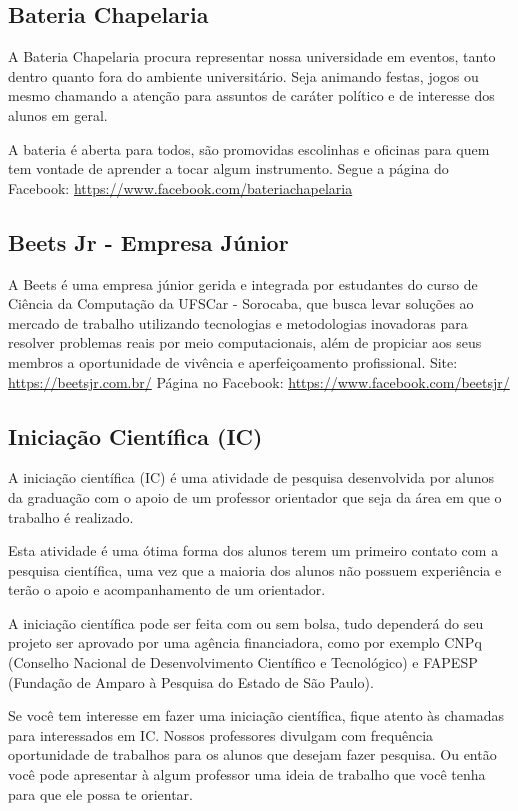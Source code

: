 \subsection{Bateria Chapelaria}
A Bateria Chapelaria procura representar nossa universidade em eventos, tanto dentro quanto fora do ambiente universitário. Seja animando festas, jogos ou mesmo chamando a atenção para assuntos de caráter político e de interesse dos alunos em geral.

A bateria é aberta para todos, são promovidas escolinhas e oficinas para quem tem vontade de aprender a tocar algum instrumento. Segue a página do Facebook: \newline \url{https://www.facebook.com/bateriachapelaria}

\subsection{Beets Jr - Empresa Júnior}
A Beets é uma empresa júnior gerida e integrada por estudantes do curso de Ciência da Computação da UFSCar - Sorocaba, que busca levar soluções ao mercado de trabalho utilizando tecnologias e metodologias inovadoras para resolver problemas reais por meio computacionais, além de propiciar aos seus membros a oportunidade de vivência e aperfeiçoamento profissional. \newline Site: \url{https://beetsjr.com.br/} \newline Página no Facebook: \url{https://www.facebook.com/beetsjr/}

\subsection{Iniciação Científica (IC)}
A iniciação científica (IC) é uma atividade de pesquisa desenvolvida por alunos da graduação com o apoio de um professor orientador que seja da área em que o trabalho é realizado.

Esta atividade é uma ótima forma dos alunos terem um primeiro contato com a pesquisa científica, uma vez que a maioria dos alunos não possuem experiência e terão o apoio e acompanhamento de um orientador.

A iniciação científica pode ser feita com ou sem bolsa, tudo dependerá do seu projeto ser aprovado por uma agência financiadora,  como por exemplo CNPq (Conselho Nacional de Desenvolvimento Científico e Tecnológico) e FAPESP (Fundação de Amparo à Pesquisa do Estado de São Paulo). 

Se você tem interesse em fazer uma iniciação científica, fique atento às chamadas para interessados em IC. Nossos professores divulgam com frequência oportunidade de trabalhos para os alunos que desejam fazer pesquisa. Ou então você pode apresentar à algum professor uma ideia de trabalho que você tenha para que ele possa te orientar.


